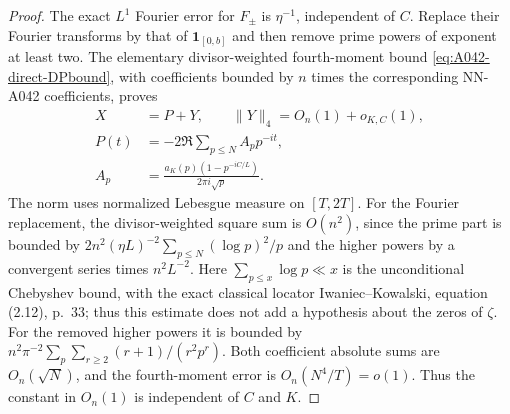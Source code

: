 \begin{proof}
The exact $L^1$ Fourier error for $F_\pm$ is $\eta^{-1}$,
independent of $C$. Replace their Fourier transforms by that
of $\mathbf1_{[0,b]}$ and then remove prime powers of exponent
at least two. The elementary divisor-weighted fourth-moment
bound \eqref{eq:A042-direct-DPbound}, with coefficients bounded
by $n$ times the corresponding NN-A042 coefficients, proves
\begin{equation}\label{eq:A043-decomposition}
 \begin{aligned}
 X&=P+Y,\qquad \|Y\|_4=O_n(1)+o_{K,C}(1),\\
 P(t)&=-2\Re\sum_{p\le N}A_p p^{-it},\\
 A_p&=\frac{a_K(p)(1-p^{-iC/L})}{2\pi i\sqrt p}.
 \end{aligned}
\end{equation}
The norm uses normalized Lebesgue measure on $[T,2T]$.
For the Fourier replacement, the divisor-weighted square sum
is $O(n^2)$, since the prime part is bounded by
$2n^2(\eta L)^{-2}\sum_{p\le N}(\log p)^2/p$ and the
higher powers by a convergent series times $n^2L^{-2}$.
Here $\sum_{p\le x}\log p\ll x$ is the unconditional
Chebyshev bound, with the exact classical locator
Iwaniec--Kowalski, equation (2.12), p.~33; thus this estimate
does not add a hypothesis about the zeros of $\zeta$.
For the removed higher powers it is bounded by
$n^2\pi^{-2}\sum_p\sum_{r\ge2}(r+1)/(r^2p^r)$.
Both coefficient absolute sums are $O_n(\sqrt N)$, and
the fourth-moment error is $O_n(N^4/T)=o(1)$.
Thus the constant in $O_n(1)$ is independent of $C$ and $K$.


\end{proof}
